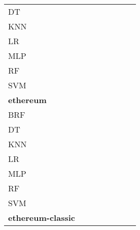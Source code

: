 \documentclass{article}
\begin{document}
{\begin{tabular}{|l|c|c|c|c|c|c|c|}
DT & \cellcolor{white}  & \cellcolor{gray}  & \cellcolor{white}  & \cellcolor{black}  & \cellcolor{white}  & \cellcolor{white}  & \cellcolor{white}  \\ 
KNN & \cellcolor{white}  & \cellcolor{white}  & \cellcolor{gray}  & \cellcolor{black}  & \cellcolor{white}  & \cellcolor{white}  & \cellcolor{white}  \\ 
LR & \cellcolor{white}  & \cellcolor{white}  & \cellcolor{white}  & \cellcolor{gray}  & \cellcolor{white}  & \cellcolor{white}  & \cellcolor{white}  \\ 
MLP & \cellcolor{white}  & \cellcolor{white}  & \cellcolor{white}  & \cellcolor{black}  & \cellcolor{gray}  & \cellcolor{white}  & \cellcolor{white}  \\ 
RF & \cellcolor{white}  & \cellcolor{black}  & \cellcolor{white}  & \cellcolor{black}  & \cellcolor{black}  & \cellcolor{gray}  & \cellcolor{black}  \\ 
SVM & \cellcolor{white}  & \cellcolor{white}  & \cellcolor{white}  & \cellcolor{white}  & \cellcolor{white}  & \cellcolor{white}  & \cellcolor{gray}  \\ 
\hline
\textbf{ethereum} \\ \hline
BRF & \cellcolor{gray}  & \cellcolor{black}  & \cellcolor{white}  & \cellcolor{black}  & \cellcolor{black}  & \cellcolor{white}  & \cellcolor{black}  \\ 
DT & \cellcolor{white}  & \cellcolor{gray}  & \cellcolor{white}  & \cellcolor{black}  & \cellcolor{white}  & \cellcolor{white}  & \cellcolor{black}  \\ 
KNN & \cellcolor{white}  & \cellcolor{black}  & \cellcolor{gray}  & \cellcolor{black}  & \cellcolor{black}  & \cellcolor{white}  & \cellcolor{black}  \\ 
LR & \cellcolor{white}  & \cellcolor{white}  & \cellcolor{white}  & \cellcolor{gray}  & \cellcolor{white}  & \cellcolor{white}  & \cellcolor{white}  \\ 
MLP & \cellcolor{white}  & \cellcolor{white}  & \cellcolor{white}  & \cellcolor{white}  & \cellcolor{gray}  & \cellcolor{white}  & \cellcolor{white}  \\ 
RF & \cellcolor{white}  & \cellcolor{black}  & \cellcolor{white}  & \cellcolor{white}  & \cellcolor{black}  & \cellcolor{gray}  & \cellcolor{black}  \\ 
SVM & \cellcolor{white}  & \cellcolor{white}  & \cellcolor{white}  & \cellcolor{white}  & \cellcolor{white}  & \cellcolor{white}  & \cellcolor{gray}  \\ 
\hline
\textbf{ethereum-classic} \\ \hline

\end{tabular}}
\end{document}

